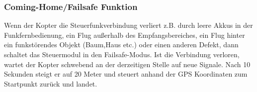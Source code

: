 \subsubsection*{Coming-Home/Failsafe Funktion}
Wenn der Kopter die Steuerfunkverbindung verliert z.B. durch leere Akkus in der Funkfernbedienung, ein Flug außerhalb des Empfangsbereiches, ein Flug hinter ein funkstörendes Objekt (Baum,Haus etc.) oder einen anderen Defekt, dann schaltet das Steuermodul in den Failsafe-Modus.
Ist die Verbindung verloren, wartet der Kopter schwebend an der derzeitigen Stelle auf neue Signale. Nach 10 Sekunden steigt er auf 20 Meter und steuert anhand der GPS Koordinaten zum Startpunkt zurück und landet.\\
